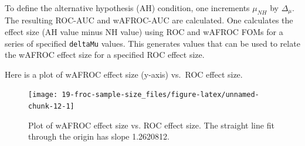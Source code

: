\documentclass[
]{book}
\newenvironment{Shaded}{\begin{snugshade}}{\end{snugshade}}
\newcommand{\AttributeTok}[1]{\textcolor[rgb]{0.77,0.63,0.00}{#1}}
\newcommand{\CommentTok}[1]{\textcolor[rgb]{0.56,0.35,0.01}{\textit{#1}}}
\newcommand{\ControlFlowTok}[1]{\textcolor[rgb]{0.13,0.29,0.53}{\textbf{#1}}}
\newcommand{\DecValTok}[1]{\textcolor[rgb]{0.00,0.00,0.81}{#1}}
\newcommand{\FloatTok}[1]{\textcolor[rgb]{0.00,0.00,0.81}{#1}}
\newcommand{\FunctionTok}[1]{\textcolor[rgb]{0.00,0.00,0.00}{#1}}
\newcommand{\NormalTok}[1]{#1}
\newcommand{\OtherTok}[1]{\textcolor[rgb]{0.56,0.35,0.01}{#1}}
\newcommand{\SpecialCharTok}[1]{\textcolor[rgb]{0.00,0.00,0.00}{#1}}
\begin{document}
To define the alternative hypothesis (AH) condition, one increments \(\mu_{NH}\) by \(\Delta_{\mu}\). The resulting ROC-AUC and wAFROC-AUC are calculated. One calculates the effect size (AH value minus NH value) using ROC and wAFROC FOMs for a series of specified \texttt{deltaMu} values. This generates values that can be used to relate the wAFROC effect size for a specified ROC effect size.

\begin{Shaded}
\end{Shaded}

Here is a plot of wAFROC effect size (y-axis) vs.~ROC effect size.

\begin{figure}

{\centering \texttt{[image: 19-froc-sample-size\_files/figure-latex/unnamed-chunk-12-1]} 

}

\caption{Plot of wAFROC effect size vs. ROC effect size. The straight line fit through the origin has slope 1.2620812.}\label{fig:unnamed-chunk-12}
\end{figure}
\end{document}
